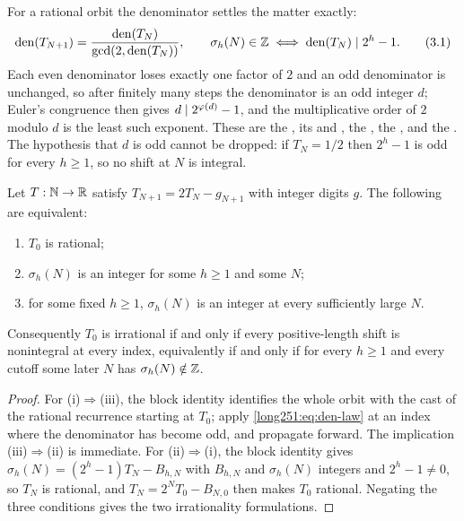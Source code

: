 \documentclass[11pt]{article}
\begin{document}
For a rational orbit the denominator settles the matter exactly:
\begin{equation}
 \operatorname{den}(T_{N+1})
 =\frac{\operatorname{den}(T_N)}{\gcd(2,\operatorname{den}(T_N))},
 \qquad
 \sigma_h(N)\in\mathbb{Z}
 \iff
 \operatorname{den}(T_N)\mid 2^h-1 .
\tag{3.1}\label{long251:eq:den-law}
\end{equation}
Each even denominator loses exactly one factor of $2$ and an odd denominator is
unchanged, so after finitely many steps the denominator is an odd integer $d$;
Euler's congruence then gives $d\mid2^{\varphi(d)}-1$, and the multiplicative order
of $2$ modulo $d$ is the least such exponent.  These are the
, its
 and
, the
, the
, and the
.  The hypothesis that $d$ is odd
cannot be dropped: if $T_N=1/2$ then $2^{h}-1$ is odd for every $h\ge1$, so no
shift at $N$ is integral.

\begin{theorem}\label{long251:res:escape-irrational}
Let $T:\mathbb{N}\to\mathbb{R}$ satisfy $T_{N+1}=2T_N-g_{N+1}$ with integer digits $g$.  The
following are equivalent:
\begin{enumerate}[label=\textup{(\roman*)}]
\item $T_0$ is rational;
\item $\sigma_h(N)$ is an integer for some $h\ge1$ and some $N$;
\item for some fixed $h\ge1$, $\sigma_h(N)$ is an integer at every
  sufficiently large $N$.
\end{enumerate}
Consequently $T_0$ is irrational if and only if every positive-length shift is
nonintegral at every index, equivalently if and only if for every $h\ge1$ and
every cutoff some later $N$ has $\sigma_h(N)\notin\mathbb{Z}$.
\end{theorem}

\begin{proof}
For \textup{(i)}$\Rightarrow$\textup{(iii)}, the block identity identifies the
whole orbit with the cast of the rational recurrence starting at $T_0$; apply
\eqref{long251:eq:den-law} at an index where the denominator has become odd, and
propagate forward.  The implication
\textup{(iii)}$\Rightarrow$\textup{(ii)} is immediate.  For
\textup{(ii)}$\Rightarrow$\textup{(i)}, the block identity gives
$\sigma_h(N)=(2^h-1)T_N-B_{h,N}$ with $B_{h,N}$ and $\sigma_h(N)$ integers and
$2^h-1\ne0$, so $T_N$ is rational, and $T_N=2^NT_0-B_{N,0}$ then makes $T_0$
rational.  Negating the three conditions gives the two irrationality
formulations.
\end{proof}
\end{document}
